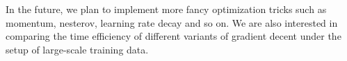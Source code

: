 \documentclass[sigconf]{acmart}
\begin{document}
In the future, we plan to implement more fancy optimization tricks such as momentum, nesterov, learning rate decay and so on. We are also interested in comparing the time efficiency of different variants of gradient decent under the setup of large-scale training data.


\normalsize

{\vskip 12pt}
\noindent




\end{document}
